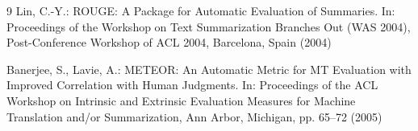 \documentclass[runningheads]{llncs}
\begin{document}
\begin{thebibliography}{9}
 Lin, C.-Y.: ROUGE: A Package for Automatic Evaluation of Summaries. In: Proceedings of the Workshop on Text Summarization Branches Out (WAS 2004), Post-Conference Workshop of ACL 2004, Barcelona, Spain (2004)

 Banerjee, S., Lavie, A.: METEOR: An Automatic Metric for MT Evaluation with Improved Correlation with Human Judgments. In: Proceedings of the ACL Workshop on Intrinsic and Extrinsic Evaluation Measures for Machine Translation and/or Summarization, Ann Arbor, Michigan, pp. 65--72 (2005)


\end{thebibliography}
\end{document}
